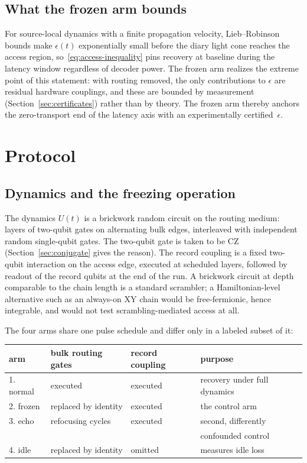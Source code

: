 \documentclass[11pt]{article}
\begin{document}
\subsection{What the frozen arm bounds}

For source-local dynamics with a finite propagation velocity,
Lieb--Robinson bounds \citep{LiebRobinson1972,Bravyi2006} make
$\epsilon(t)$ exponentially small before the diary light cone reaches
the access region, so~\eqref{eq:access-inequality} pins recovery at
baseline during the latency window regardless of decoder power.  The
frozen arm realizes the extreme point of this statement: with routing
removed, the only contributions to $\epsilon$ are residual hardware
couplings, and these are bounded by measurement
(Section~\ref{sec:certificates}) rather than by theory.  The frozen
arm thereby anchors the zero-transport end of the latency axis with
an experimentally certified~$\epsilon$.

\section{Protocol}
\label{sec:protocol}

\subsection{Dynamics and the freezing operation}
\label{sec:freezing}

The dynamics $U(t)$ is a brickwork random circuit on the routing
medium: layers of two-qubit gates on alternating bulk edges,
interleaved with independent random single-qubit gates.  The
two-qubit gate is taken to be CZ (Section~\ref{sec:conjugate} gives
the reason).  The record coupling is a fixed two-qubit interaction on
the access edge, executed at scheduled layers, followed by readout of
the record qubits at the end of the run.  A brickwork circuit at
depth comparable to the chain length is a standard scrambler; a
Hamiltonian-level alternative such as an always-on XY chain would be
free-fermionic, hence integrable, and would not test
scrambling-mediated access at all.

The four arms share one pulse schedule and differ only in a labeled
subset of it:

\begin{center}
\begin{tabular}{@{}llll@{}}
\toprule
arm & bulk routing gates & record coupling & purpose \\
\midrule
1. normal & executed & executed & recovery under full dynamics \\
2. frozen & replaced by identity & executed & the control arm \\
3. echo & refocusing cycles & executed & second, differently \\
 & & & confounded control \\
4. idle & replaced by identity & omitted & measures idle loss \\
\bottomrule
\end{tabular}
\end{center}
\end{document}
